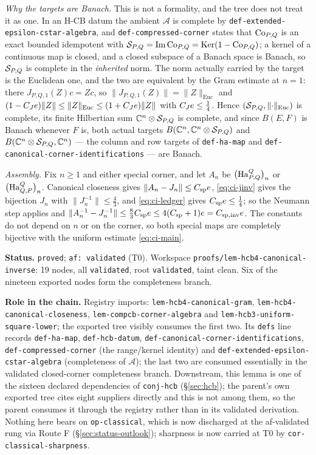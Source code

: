 \emph{Why the targets are Banach.} This is not a formality, and the tree does not treat it
as one. In an H-CB datum the ambient $\mathcal A$ is complete by
\texttt{def-extended-epsilon-cstar-algebra}, and \texttt{def-compressed-corner} states that
$\mathrm{Co}_{P,Q}$ is an exact bounded idempotent with
$\mathcal S_{P,Q}=\operatorname{Im}\mathrm{Co}_{P,Q}=\operatorname{Ker}(1-\mathrm{Co}_{P,Q})$; a kernel of a continuous map is closed, and a
closed subspace of a Banach space is Banach, so $\mathcal S_{P,Q}$ is complete in the
\emph{inherited} norm. The norm actually carried by the target is the Euclidean one, and
the two are equivalent by the Gram estimate at $n=1$: there $J_{P,Q,1}(Z)c=Zc$, so
$\lVert J_{P,Q,1}(Z)\rVert=\lVert Z\rVert_{\mathrm{Euc}}$ and
$(1-C_Je)\lVert Z\rVert\le\lVert Z\rVert_{\mathrm{Euc}}\le(1+C_Je)\lVert Z\rVert$ with
$C_Je\le\tfrac14$. Hence $(\mathcal S_{P,Q},\lVert\cdot\rVert_{\mathrm{Euc}})$ is complete,
its finite Hilbertian sum $\mathbb C^{n}\otimes\mathcal S_{P,Q}$ is complete, and since
$B(E,F)$ is Banach whenever $F$ is, both actual targets
$B(\mathbb C^{n},\mathbb C^{n}\otimes\mathcal S_{P,Q})$ and
$B(\mathbb C^{n}\otimes\mathcal S_{P,Q},\mathbb C^{n})$ --- the column and row targets of
\texttt{def-ha-map} and \texttt{def-canonical-corner-identifications} --- are Banach.

\emph{Assembly.} Fix $n\ge1$ and either special corner, and let $A_n$ be
$\bigl(\mathrm{Ha}^{Q}_{P,Q}\bigr)_{n}$ or $\bigl(\mathrm{Ha}^{Q}_{Q,P}\bigr)_{n}$. Canonical closeness gives
$\lVert A_n-J_n\rVert\le C_{\mathrm{sp}}e$, \eqref{eq:ci-jinv} gives the bijection $J_n$
with $\lVert J_n^{-1}\rVert\le\tfrac43$, and \eqref{eq:ci-ledger} gives
$C_{\mathrm{sp}}e\le\tfrac14$; so the Neumann step applies and
$\lVert A_n^{-1}-J_n^{-1}\rVert\le\tfrac83C_{\mathrm{sp}}e\le
4(C_{\mathrm{sp}}+1)e=C_{\mathrm{sp,inv}}e$. The constants do not depend on $n$ or
on the corner, so both special maps are completely bijective with the uniform estimate
\eqref{eq:ci-main}.

\medskip
\noindent\textbf{Status.} \texttt{proved}; \texttt{af: validated} (T0). Workspace
\texttt{proofs/lem-hcb4-canonical-inverse}: 19 nodes, all \texttt{validated}, root
\texttt{validated}, taint clean. Six of the nineteen exported nodes form the completeness
branch.

\noindent\textbf{Role in the chain.} Registry imports:
\texttt{lem-hcb4-canonical-gram},
\texttt{lem-hcb4-canonical-closeness},
\texttt{lem-compcb-corner-algebra} and
\texttt{lem-hcb3-uniform-square-lower}; the exported tree visibly consumes the first two.
Its \texttt{defs} line records \texttt{def-ha-map}, \texttt{def-hcb-datum},
\texttt{def-canonical-corner-identifications}, \texttt{def-compressed-corner} (the
range/kernel identity) and \texttt{def-extended-epsilon-cstar-algebra} (completeness of
$\mathcal A$); the last two are consumed essentially in the validated
closed-corner completeness branch. Downstream, this lemma is one of
the sixteen declared dependencies of \texttt{conj-hcb} (\S\ref{sec:hcb}); the parent's own
exported tree cites eight suppliers directly and this is not among them, so the parent
consumes it through the registry rather than in its validated derivation. Nothing here
bears on \texttt{op-classical}, which is now discharged at the af-validated rung via Route F (\S\ref{sec:status-outlook}); sharpness is now carried at T0 by \texttt{cor-classical-sharpness}.
